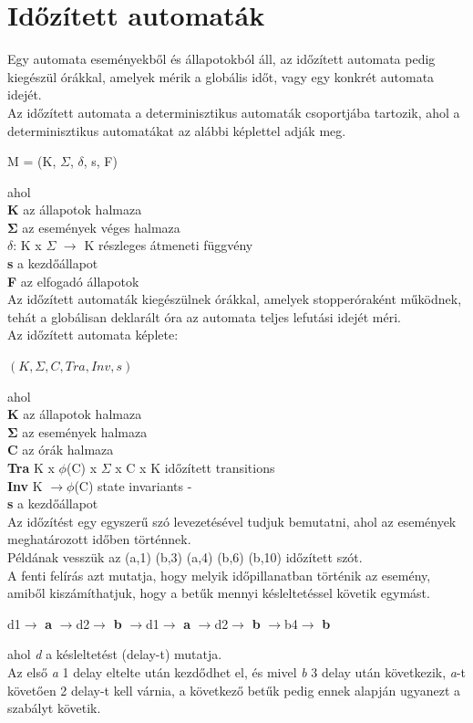\documentclass {report}
\begin{document}
\section{Időzített automaták}
 Egy automata eseményekből és állapotokból áll, az időzített automata pedig kiegészül órákkal, amelyek mérik a globális időt, vagy egy konkrét automata idejét. \\
 Az időzített automata a determinisztikus automaták csoportjába tartozik, ahol a determinisztikus automatákat az alábbi képlettel adják meg.
 \begin{center}
 M = (K, $\Sigma$, $\delta$, s, F)
 \end{center}
 ahol\\
 \indent \textbf{K} az állapotok halmaza\\
 \indent $\mathbf{\Sigma}$ az események véges halmaza\\
 \indent \textbf{$\delta$}: K x $\Sigma$ $\rightarrow$ K részleges átmeneti függvény\\
 \indent \textbf{s} a kezdőállapot\\
 \indent \textbf{F} az elfogadó állapotok \\
Az időzített automaták kiegészülnek órákkal, amelyek stopperóraként működnek, tehát a globálisan deklarált óra az automata teljes lefutási idejét méri.\\
Az időzített automata képlete:\\
\begin{center}
$(K, \Sigma, C, Tra, Inv, s)$\\
\end{center}
ahol\\
\indent \textbf{K} az állapotok halmaza\\
\indent $\mathbf{\Sigma}$ az események halmaza\\
\indent \textbf{C} az órák halmaza\\
\indent \textbf{Tra} K x $\phi$(C) x $ \Sigma $ x C x K időzített transitions\\
\indent \textbf{Inv} K $
\rightarrow  \phi$(C) state invariants -\\
\indent \textbf{s} a kezdőállapot \\
Az időzítést egy egyszerű szó levezetésével tudjuk bemutatni, ahol az események meghatározott időben történnek.\\
Példának vesszük az (a,1) (b,3) (a,4) (b,6) (b,10) időzített szót.\\
A fenti felírás azt mutatja, hogy melyik időpillanatban történik az esemény, amiből kiszámíthatjuk, hogy a betűk mennyi késleltetéssel követik egymást. 
\begin{center}
d1$\rightarrow$ \textbf{a} $\rightarrow$d2$\rightarrow$ \textbf{b} $\rightarrow$d1$\rightarrow$ \textbf{a} $\rightarrow$d2$\rightarrow$ \textbf{b} $\rightarrow$b4$\rightarrow$ \textbf{b}
\end{center}
ahol \emph{d} a késleltetést (delay-t) mutatja.\\
Az első \emph{a} 1 delay eltelte után kezdődhet el, és mivel \emph{b} 3 delay után következik, \emph{a}-t követően 2 delay-t kell várnia, a következő betűk pedig ennek alapján ugyanezt a szabályt követik. \\
\end{document}
